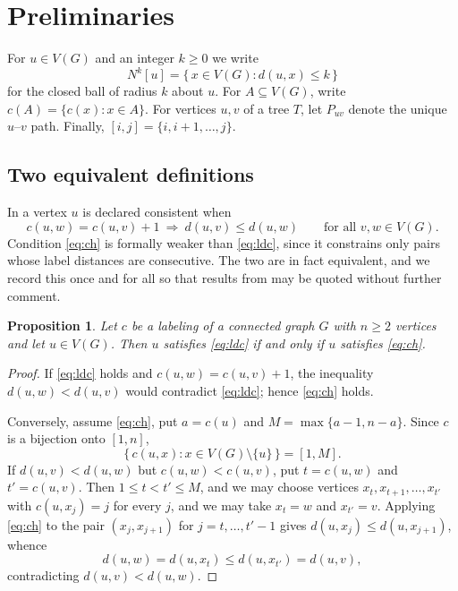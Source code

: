 \documentclass[reqno,10pt]{article}
\newtheorem{proposition}[theorem]{Proposition}
\theoremstyle{definition}
\numberwithin{equation}{section}
\numberwithin{theorem}{section}
\newcommand{\Ball}[2]{N^{#2}[#1]}
\begin{document}
\section{Preliminaries}
\label{sec:prelim}

For $u\in V(G)$ and an integer $k\ge0$ we write
\[
  \Ball{u}{k}=\{\,x\in V(G) : d(u,x)\le k\,\}
\]
for the closed ball of radius $k$ about $u$. For $A\subseteq V(G)$, write
$c(A)=\{c(x):x\in A\}$. For vertices $u,v$ of a tree $T$, let $P_{uv}$ denote
the unique $u$--$v$ path. Finally, $[i,j]=\{i,i+1,\dots,j\}$.

\subsection{Two equivalent definitions}

In \cite{CH2025} a vertex $u$ is declared consistent when
\begin{equation}
  c(u,w)=c(u,v)+1 \ \Longrightarrow\ d(u,v)\le d(u,w)
  \qquad\text{for all } v,w\in V(G).
  \label{eq:ch}
\end{equation}
Condition \eqref{eq:ch} is formally weaker than \eqref{eq:ldc}, since it
constrains only pairs whose label distances are consecutive.  The two are in
fact equivalent, and we record this once and for all so that results from
\cite{CH2025} may be quoted without further comment.

\begin{proposition}
\label{prop:equiv}
Let $c$ be a labeling of a connected graph $G$ with $n\ge 2$ vertices and let
$u\in V(G)$.  Then $u$ satisfies \eqref{eq:ldc} if and only if $u$ satisfies
\eqref{eq:ch}.
\end{proposition}

\begin{proof}
If \eqref{eq:ldc} holds and $c(u,w)=c(u,v)+1$, the inequality
$d(u,w)<d(u,v)$ would contradict \eqref{eq:ldc}; hence \eqref{eq:ch} holds.

Conversely, assume \eqref{eq:ch}, put $a=c(u)$ and
$M=\max\{a-1,n-a\}$. Since $c$ is a bijection onto $[1,n]$,
\[
  \{\,c(u,x) : x\in V(G)\setminus\{u\}\,\}=[1,M].
\]
If $d(u,v)<d(u,w)$ but $c(u,w)<c(u,v)$, put $t=c(u,w)$ and
$t'=c(u,v)$. Then $1\le t<t'\le M$, and we may choose vertices
$x_t,x_{t+1},\dots,x_{t'}$ with $c(u,x_j)=j$ for every $j$, and we may take
$x_t=w$ and $x_{t'}=v$.  Applying \eqref{eq:ch} to the pair $(x_j,x_{j+1})$ for
$j=t,\dots,t'-1$ gives $d(u,x_j)\le d(u,x_{j+1})$, whence
\[
  d(u,w)=d(u,x_t)\le d(u,x_{t'})=d(u,v),
\]
contradicting $d(u,v)<d(u,w)$.
\end{proof}
\end{document}
